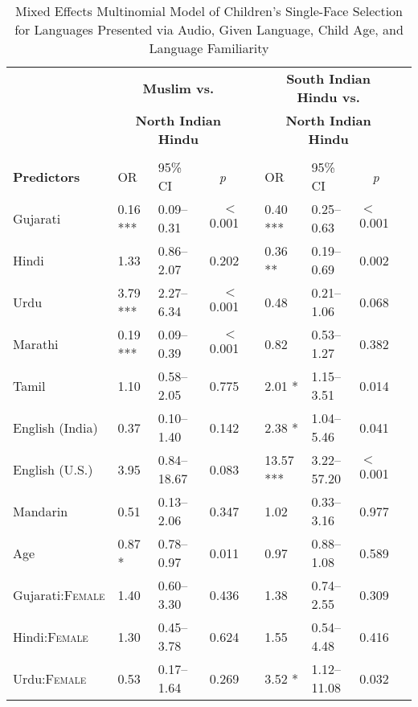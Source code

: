 \begin{table}[ht]
\small
\caption{Mixed Effects Multinomial Model of Children's Single-Face Selection for Languages Presented via Audio, Given Language, Child Age, and Language Familiarity}\label{tab:faimod}
    \centering
    \vspace{5pt}
    \setlength{\tabcolsep}{1.75pt} 
\begin{threeparttable}
\begin{tabular}{lllrllllr}
\toprule
& \multicolumn{3}{c}{\textbf{Muslim vs.}} & & \multicolumn{3}{c}{\textbf{South Indian Hindu vs.}}\\
& \multicolumn{3}{c}{\textbf{North Indian Hindu}\tnote{a}} & & \multicolumn{3}{c}{\textbf{North Indian Hindu}\tnote{a}}\\
\cline{2-4} \cline{6-8} \\[-.75em]
\textbf{Predictors} & OR & 95\% CI & \multicolumn{1}{c}{\textit{p}} & & OR & 95\% CI & \multicolumn{1}{c}{\textit{p}} \\ 
\midrule
 Gujarati & 0.16 *** & 0.09--0.31 & $<$0.001 &  & 0.40 *** & 0.25--0.63 & $<$0.001 \\ 
 Hindi & 1.33 & 0.86--2.07 & 0.202 &  & 0.36 ** & 0.19--0.69 & 0.002 \\ 
 Urdu & 3.79 *** & 2.27--6.34 & $<$0.001 &  & 0.48 & 0.21--1.06 & 0.068 \\ 
 Marathi & 0.19 *** & 0.09--0.39 & $<$0.001 &  & 0.82 & 0.53--1.27 & 0.382 \\ 
 Tamil & 1.10 & 0.58--2.05 & 0.775 &  & 2.01 * & 1.15--3.51 & 0.014 \\ 
 English (India) & 0.37 & 0.10--1.40 & 0.142 &  & 2.38 * & 1.04--5.46 & 0.041 \\ 
 English (U.S.) & 3.95 & 0.84--18.67 & 0.083 &  & 13.57 *** & 3.22--57.20 & $<$0.001 \\ 
 Mandarin & 0.51 & 0.13--2.06 & 0.347 &  & 1.02 & 0.33--3.16 & 0.977 \\  
 Age\tnote{b} & 0.87 * & 0.78--0.97 & 0.011 &  & 0.97 & 0.88--1.08 & 0.589 \\ 
 Gujarati:\textsc{Female}  & 1.40 & 0.60--3.30 & 0.436 &  & 1.38 & 0.74--2.55 & 0.309 \\
 Hindi:\textsc{Female}  & 1.30 & 0.45--3.78 & 0.624 &  & 1.55 & 0.54--4.48 & 0.416 \\ 
 Urdu:\textsc{Female}  & 0.53 & 0.17--1.64 & 0.269 &  & 3.52 * & 1.12--11.08 & 0.032 \\ 

\end{tabular}
\end{threeparttable}
\end{table}
